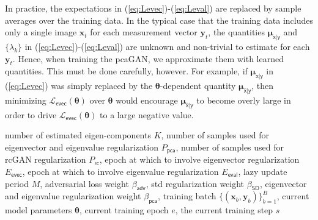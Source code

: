 \documentclass{article}
\theoremstyle{plain}
\theoremstyle{definition}
\theoremstyle{remark}
\renewcommand{\hat}{\widehat}
\renewcommand{\vec}[1]{\ensuremath{\boldsymbol{#1}}}
\newcommand{\mc}[1]{\ensuremath{\mathcal{#1}}}
\renewcommand{\eqref}[1]{(\ref{eq:#1})}
\newcommand{\train}{_{\mathsf{rc}}}
\newcommand{\eig}{_{\mathsf{pca}}}
\newcommand{\eval}{_{\mathsf{eval}}}
\newcommand{\evec}{_{\mathsf{evec}}}
\newcommand{\Levec}{\mc{L}\evec}
\newcommand{\betaadv}{\beta_{\mathsf{adv}}}
\newcommand{\betapca}{\beta_{\mathsf{pca}}}
\newcommand{\betastd}{\beta_{\mathsf{SD}}}
\newcommand{\muxgy}{\vec{\mu}_{\mathsf{x}|\mathsf{y}}}
\newcommand{\muxgyhat}{\vec{\mu}_{\hat{\mathsf{x}}|\mathsf{y}}}
\begin{document}
In practice, the expectations in \eqref{Levec}-\eqref{Leval} are replaced by sample averages over the training data.
In the typical case that the training data includes only a single image $\vec{x}_t$ for each measurement vector $\vec{y}_t$, the quantities $\muxgy$ and $\{\lambda_k\}$ in \eqref{Levec}-\eqref{Leval} are unknown and non-trivial to estimate for each $\vec{y}_t$.
Hence, when training the pcaGAN, we approximate them with learned quantities.
This must be done carefully, however.
For example, if $\muxgy$ in \eqref{Levec} was simply replaced by the $\vec{\theta}$-dependent quantity $\muxgyhat$, then minimizing $\Levec(\vec{\theta})$ over $\vec{\theta}$ would encourage $\muxgyhat$ to become overly large in order to drive $\Levec(\vec{\theta})$ to a large negative value.

\begin{algorithm}[t]
\caption{pcaGAN generator-training iteration}\label{alg:pcaGAN}
\begin{algorithmic}[1]
\Require 
number of estimated eigen-components $K$, 
number of samples used for eigenvector and eigenvalue regularization $P\eig$, 
number of samples used for rcGAN regularization $P\train$, 
epoch at which to involve eigenvector regularization $E\evec$, 
epoch at which to involve eigenvalue regularization $E\eval$, 
lazy update period $M$, 
adversarial loss weight $\betaadv$, 
std regularization weight $\betastd$, 
eigenvector and eigenvalue regularization weight $\betapca$, 
training batch $\{(\vec{x}_b, \vec{y}_b)\}_{b=1}^B$, 
current model parameters $\vec{\theta}$,
current training epoch $e$, the current training step $s$


\end{algorithmic}
\end{algorithm}
\end{document}
